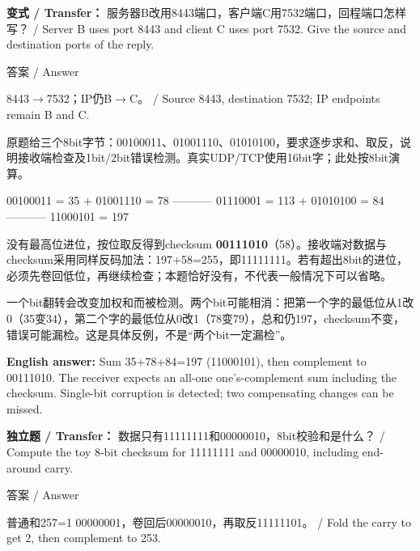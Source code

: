 \textbf{变式 / Transfer：} 服务器B改用8443端口，客户端C用7532端口，回程端口怎样写？ / Server B uses port 8443 and client C uses port 7532. Give the source and destination ports of the reply.



\begin{StudySolution}{答案 / Answer}


8443\ensuremath{\to}7532；IP仍B\ensuremath{\to}C。 / Source 8443, destination 7532; IP endpoints remain B and C.


\end{StudySolution}








原题给三个8bit字节：00100011、01001110、01010100，要求逐步求和、取反，说明接收端检查及1bit/2bit错误检测。真实UDP/TCP使用16bit字；此处按8bit演算。



\begin{StudyCode}
  00100011   = 35
+ 01001110   = 78
-----------
  01110001   = 113
+ 01010100   = 84
-----------
  11000101   = 197
\end{StudyCode}


没有最高位进位，按位取反得到checksum \textbf{00111010}（58）。接收端对数据与checksum采用同样反码加法：197+58=255，即11111111。若有超出8bit的进位，必须先卷回低位，再继续检查；本题恰好没有，不代表一般情况下可以省略。


一个bit翻转会改变加权和而被检测。两个bit可能相消：把第一个字的最低位从1改0（35变34），第二个字的最低位从0改1（78变79），总和仍197，checksum不变，错误可能漏检。这是具体反例，不是“两个bit一定漏检”。


\textbf{English answer:} Sum 35+78+84=197 (11000101), then complement to 00111010. The receiver expects an all-one one's-complement sum including the checksum. Single-bit corruption is detected; two compensating changes can be missed.


\textbf{独立题 / Transfer：} 数据只有11111111和00000010，8bit校验和是什么？ / Compute the toy 8-bit checksum for 11111111 and 00000010, including end-around carry.



\begin{StudySolution}{答案 / Answer}


普通和257=1 00000001，卷回后00000010，再取反11111101。 / Fold the carry to get 2, then complement to 253.


\end{StudySolution}






